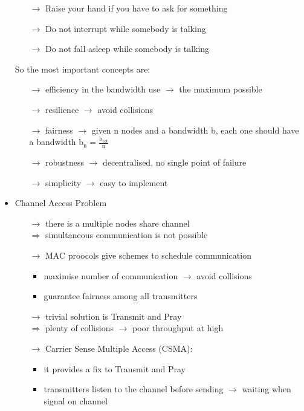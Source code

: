 \begin{itemize}
\begin{itemize}
        \item[$\rightarrow$] Raise your hand if you have to ask for something
        \item[$\rightarrow$] Do not interrupt while somebody is talking
        \item[$\rightarrow$] Do not fall asleep while somebody is talking
    \end{itemize}
    So the most important concepts are:
    \begin{itemize}
        \item[$\rightarrow$] efficiency in the bandwidth use $\rightarrow$ the maximum possible
        \item[$\rightarrow$] resilience $\rightarrow$ avoid collisions
        \item[$\rightarrow$] fairness $\rightarrow$ given n nodes and a bandwidth b, each one should have a bandwidth $\text{b}_{\text{n}}=\frac{\text{b}_{\text{tot}}}{\text{n}}$
        \item[$\rightarrow$] robustness $\rightarrow$ decentralised, no single point of failure
        \item[$\rightarrow$] simplicity $\rightarrow$ easy to implement
    \end{itemize}
    \item Channel Access Problem
    \begin{itemize}
        \item[$\rightarrow$] there is a multiple nodes share channel\\
        $\Rightarrow$ simultaneous communication is not possible
        \newpage
        \item[$\rightarrow$] MAC proocols give schemes to schedule communication
        \begin{itemize}
            \item maximise number of communication $\rightarrow$ avoid collisions
            \item guarantee fairness among all transmitters
        \end{itemize}
        \item[$\rightarrow$] trivial solution is Transmit and Pray\\$\Rightarrow$ plenty of collisions $\rightarrow$ poor throughput at high
        \item[$\rightarrow$] Carrier Sense Multiple Access (CSMA):
        \begin{itemize}
            \item it provides a fix to Transmit and Pray
            \item transmitters listen to the channel before sending $\rightarrow$ waiting when signal on channel

\end{itemize}
\end{itemize}
\end{itemize}
